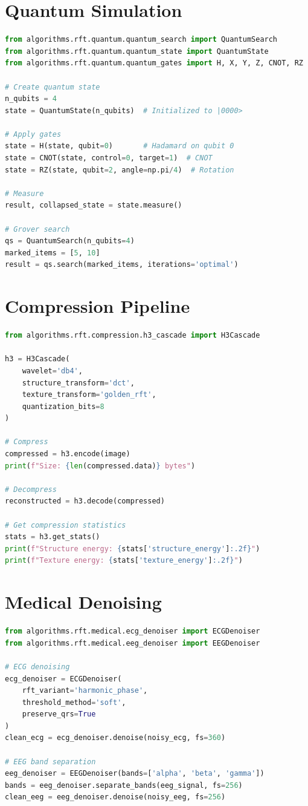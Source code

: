 \documentclass[11pt, a4paper, openany]{book}
\theoremstyle{definition}
\begin{document}
\section{Quantum Simulation}
\begin{lstlisting}[language=Python, caption={Quantum Simulation API}]
from algorithms.rft.quantum.quantum_search import QuantumSearch
from algorithms.rft.quantum.quantum_state import QuantumState
from algorithms.rft.quantum.quantum_gates import H, X, Y, Z, CNOT, RZ

# Create quantum state
n_qubits = 4
state = QuantumState(n_qubits)  # Initialized to |0000>

# Apply gates
state = H(state, qubit=0)       # Hadamard on qubit 0
state = CNOT(state, control=0, target=1)  # CNOT
state = RZ(state, qubit=2, angle=np.pi/4)  # Rotation

# Measure
result, collapsed_state = state.measure()

# Grover search
qs = QuantumSearch(n_qubits=4)
marked_items = [5, 10]
result = qs.search(marked_items, iterations='optimal')
\end{lstlisting}

\section{Compression Pipeline}
\begin{lstlisting}[language=Python, caption={H3 Compression API}]
from algorithms.rft.compression.h3_cascade import H3Cascade

h3 = H3Cascade(
    wavelet='db4',
    structure_transform='dct',
    texture_transform='golden_rft',
    quantization_bits=8
)

# Compress
compressed = h3.encode(image)
print(f"Size: {len(compressed.data)} bytes")

# Decompress
reconstructed = h3.decode(compressed)

# Get compression statistics
stats = h3.get_stats()
print(f"Structure energy: {stats['structure_energy']:.2f}")
print(f"Texture energy: {stats['texture_energy']:.2f}")
\end{lstlisting}

\section{Medical Denoising}
\begin{lstlisting}[language=Python, caption={Medical Denoising API}]
from algorithms.rft.medical.ecg_denoiser import ECGDenoiser
from algorithms.rft.medical.eeg_denoiser import EEGDenoiser

# ECG denoising
ecg_denoiser = ECGDenoiser(
    rft_variant='harmonic_phase',
    threshold_method='soft',
    preserve_qrs=True
)
clean_ecg = ecg_denoiser.denoise(noisy_ecg, fs=360)

# EEG band separation
eeg_denoiser = EEGDenoiser(bands=['alpha', 'beta', 'gamma'])
bands = eeg_denoiser.separate_bands(eeg_signal, fs=256)
clean_eeg = eeg_denoiser.denoise(noisy_eeg, fs=256)
\end{lstlisting}
\end{document}

